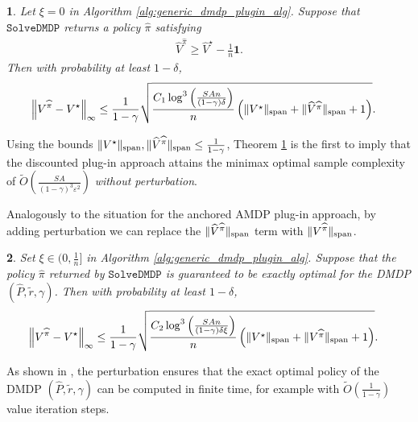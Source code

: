 \documentclass{article}
\theoremstyle{plain}
\newtheorem{thm}{\protect\theoremname}
\theoremstyle{plain}
\theoremstyle{remark}
\theoremstyle{plain}
\theoremstyle{plain}
\providecommand{\theoremname}{Theorem}
\newcommand{\Phat}{\widehat{P}}
\newcommand{\Vhat}{\widehat{V}}
\newcommand{\one}{\mathbf{1}}
\newcommand{\pihat}{\widehat{\pi}}
\newcommand{\Otilde}{\widetilde{O}}
\newcommand{\SolveDMDP}{\texttt{SolveDMDP}}
\newcommand{\plugin}{plug-in\xspace}
\begin{document}
\begin{thm}
    \label{thm:DMDP_main_thm}
Let $\xi = 0$ in Algorithm \ref{alg:generic_dmdp_plugin_alg}. Suppose that $\SolveDMDP$ returns a policy $\pihat$ satisfying
\begin{align}
    \Vhat^{\pihat} \geq \Vhat^\star - \frac{1}{n}\one \label{eq:solvedmdp_opt_cond}.
\end{align}
Then with probability at least $1 - \delta$,
    \begin{align*}
    \infnorm{V^{\pihat} - V^\star} &\leq  \frac{1 }{1-\gamma}\sqrt{\frac{C_1  \log^3 \left( \frac{SAn}{(1-\gamma) \delta}\right) }{n}\left( \spannorm{V^{\star}} + \spannorm{\Vhat^{\pihat}} + 1\right) }.
\end{align*}
\end{thm}
Using the bounds $\spannorm{V^\star}, \spannorm{\Vhat^{\pihat}} \leq \frac{1}{1-\gamma}$, Theorem \ref{thm:DMDP_main_thm} is the first to imply that the discounted \plugin approach attains the minimax optimal sample complexity of $\Otilde\left(\frac{SA}{(1-\gamma)^3 \varepsilon^2}\right)$ \textit{without perturbation}. 

Analogously to the situation for the anchored AMDP \plugin approach, by adding perturbation we can replace the $\spannorm{\Vhat^{\pihat}}$ term with $\spannorm{V^{\pihat}}$.

\begin{thm}
\label{thm:DMDP_pert_thm}
Set $\xi \in (0,   \frac{1}{n}]$ in Algorithm \ref{alg:generic_dmdp_plugin_alg}. Suppose that the policy $\pihat$ returned by $\SolveDMDP$ is guaranteed to be exactly optimal for the DMDP $(\Phat, \widetilde{r}, \gamma)$. Then with probability at least $1 - \delta$,
    \begin{align*}
    \infnorm{V^{\pihat} - V^\star} &\leq  \frac{1 }{1-\gamma}\sqrt{\frac{C_2  \log^3 \left( \frac{SAn}{(1-\gamma) \delta \xi}\right) }{n}\left( \spannorm{V^{\star}} + \spannorm{V^{\pihat}} + 1\right) }.
\end{align*}
\end{thm}
As shown in \cite{li_breaking_2020}, the perturbation ensures that the exact optimal policy of the DMDP $(\Phat, \widetilde{r}, \gamma)$ can be computed in finite time, for example with $\Otilde\left( \frac{1}{1-\gamma}\right)$ value iteration steps.
\end{document}
